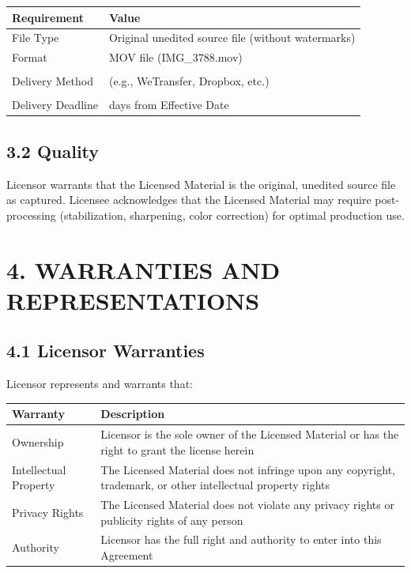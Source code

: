 \documentclass[
  11pt,
]{article}
\begin{document}
\begin{table}[h]
\centering
\begin{tabular}{L{3.5cm}L{10.5cm}}
\toprule
\textbf{Requirement} & \textbf{Value} \\
\midrule
File Type & Original unedited source file (without watermarks) \\
Format & MOV file (IMG\_3788.mov) \\
\vspace{0.3cm} & \\
Delivery Method & \underline{\hspace{6cm}} (e.g., WeTransfer, Dropbox, etc.) \\
\vspace{0.3cm} & \\
Delivery Deadline & \underline{\hspace{2cm}} days from Effective Date \\
\bottomrule
\end{tabular}
\end{table}

\hypertarget{quality}{%
\subsection{3.2 Quality}\label{quality}}

Licensor warrants that the Licensed Material is the original, unedited
source file as captured. Licensee acknowledges that the Licensed
Material may require post-processing (stabilization, sharpening, color
correction) for optimal production use.

\hypertarget{warranties-and-representations}{%
\section{4. WARRANTIES AND
REPRESENTATIONS}\label{warranties-and-representations}}

\hypertarget{licensor-warranties}{%
\subsection{4.1 Licensor Warranties}\label{licensor-warranties}}

Licensor represents and warrants that:

\begin{table}[h]
\centering
\begin{tabular}{L{3.5cm}L{10.5cm}}
\toprule
\textbf{Warranty} & \textbf{Description} \\
\midrule
Ownership & Licensor is the sole owner of the Licensed Material or has the right to grant the license herein \\
Intellectual Property & The Licensed Material does not infringe upon any copyright, trademark, or other intellectual property rights \\
Privacy Rights & The Licensed Material does not violate any privacy rights or publicity rights of any person \\
Authority & Licensor has the full right and authority to enter into this Agreement \\
\bottomrule
\end{tabular}
\end{table}
\end{document}
